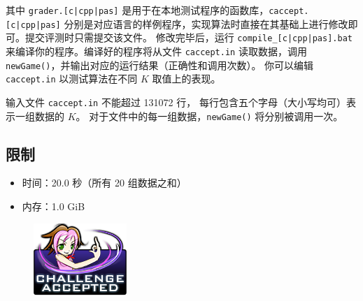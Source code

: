 \documentclass[UTF8, 11pt, a4paper]{article}
\begin{document}
其中 \texttt{grader.[c|cpp|pas]} 是用于在本地测试程序的函数库，\texttt{caccept.[c|cpp|pas]} %
分别是对应语言的样例程序，实现算法时直接在其基础上进行修改即可。提交评测时只需提交该文件。%
修改完毕后，运行 \texttt{compile\_[c|cpp|pas].bat} 来编译你的程序。编译好的程序将从文件%
\texttt{caccept.in} 读取数据，调用 \texttt{newGame()}，并输出对应的运行结果（正确性和调用次数）。%
你可以编辑 \texttt{caccept.in} 以测试算法在不同 $K$ 取值上的表现。

输入文件 \texttt{caccept.in} 不能超过 131072 行，%
每行包含五个字母（大小写均可）表示一组数据的 $K$。%
对于文件中的每一组数据，\texttt{newGame()} 将分别被调用一次。

\subsection*{限制}
\begin{itemize}
\item 时间：20.0 秒（所有 20 组数据之和）
\item 内存：1.0 GiB
\end{itemize}

\begin{figure}[h]\centering
\includegraphics[scale=0.55]{challengeaccepted.png}
\end{figure}
\end{document}
